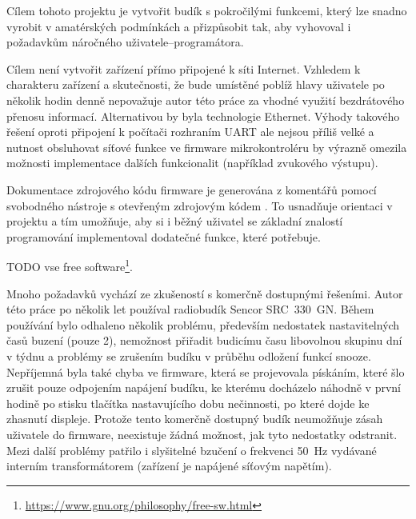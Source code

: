Cílem tohoto projektu je vytvořit budík s pokročilými funkcemi, který lze
snadno vyrobit v amatérských podmínkách a přizpůsobit tak, aby vyhovoval
i požadavkům náročného uživatele--programátora. %

Cílem není vytvořit zařízení přímo připojené k síti Internet. Vzhledem
k charakteru zařízení a skutečnosti, že bude umístěné poblíž hlavy uživatele
po několik hodin denně nepovažuje autor této práce za vhodné využití
bezdrátového přenosu informací. Alternativou by byla technologie Ethernet.
Výhody takového řešení oproti připojení k počítači rozhraním UART ale nejsou
příliš velké a nutnost obsluhovat síťové funkce ve firmware mikrokontroléru by
výrazně omezila možnosti implementace dalších funkcionalit (například zvukového
výstupu).

Dokumentace zdrojového kódu firmware je generována z komentářů pomocí
svobodného nástroje s otevřeným zdrojovým kódem . To
usnadňuje orientaci v projektu a tím umožňuje, aby si i běžný uživatel se
základní znalostí programování implementoval dodatečné funkce, které potřebuje.

TODO vse free
software\footnote{\url{https://www.gnu.org/philosophy/free-sw.html}}.

Mnoho požadavků vychází ze zkušeností s komerčně dostupnými řešeními. Autor
této práce po několik let používal radiobudík Sencor SRC~330~GN.
Během používání bylo odhaleno několik problému, především nedostatek
nastavitelných časů buzení (pouze 2), nemožnost přiřadit budicímu času
libovolnou skupinu dní v týdnu a problémy se zrušením budíku v průběhu odložení
funkcí snooze. Nepříjemná byla také chyba ve firmware, která se
projevovala pískáním, které šlo zrušit pouze odpojením napájení budíku,
ke kterému docházelo náhodně v první hodině po stisku tlačítka nastavujícího
dobu nečinnosti, po které dojde ke zhasnutí displeje. Protože tento komerčně
dostupný budík neumožňuje zásah uživatele do firmware, neexistuje žádná
možnost, jak tyto nedostatky odstranit. Mezi další problémy patřilo
i slyšitelné bzučení o frekvenci \SI{50}{\hertz} vydávané interním
transformátorem (zařízení je napájené síťovým napětím).

